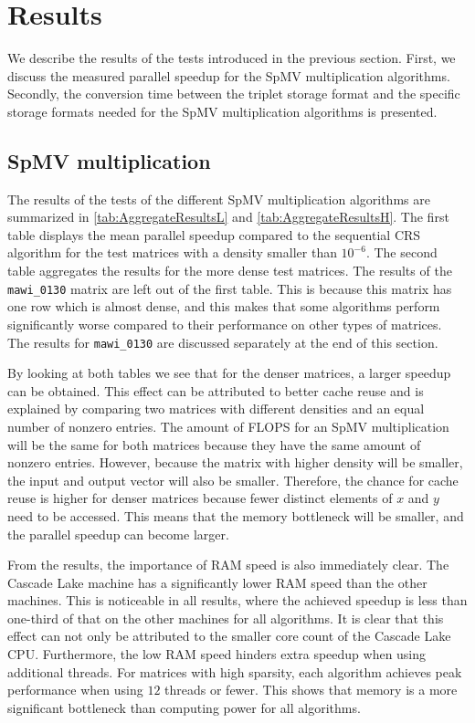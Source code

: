 \documentclass{siamart220329}
\begin{document}
\section{Results}\label{sec:results}
We describe the results of the tests introduced in the previous section. First, we discuss the measured parallel speedup for the SpMV multiplication algorithms. Secondly, the conversion time between the triplet storage format and the specific storage formats needed for the SpMV multiplication algorithms is presented.

\subsection{SpMV multiplication}
The results of the tests of the different SpMV multiplication algorithms are summarized in \cref{tab:AggregateResultsL} and \cref{tab:AggregateResultsH}. The first table displays the mean parallel speedup compared to the sequential CRS algorithm for the test matrices with a density smaller than $10^{-6}$. The second table aggregates the results for the more dense test matrices. The results of the \texttt{mawi\_0130} matrix are left out of the first table. This is because this matrix has one row which is almost dense, and this makes that some algorithms perform significantly worse compared to their performance on other types of matrices. The results for \texttt{mawi\_0130} are discussed separately at the end of this section.




By looking at both tables we see that for the denser matrices, a larger speedup can be obtained. This effect can be attributed to better cache reuse and is explained by comparing two matrices with different densities and an equal number of nonzero entries. The amount of FLOPS for an SpMV multiplication will be the same for both matrices because they have the same amount of nonzero entries. However, because the matrix with higher density will be smaller, the input and output vector will also be smaller. Therefore, the chance for cache reuse is higher for denser matrices because fewer distinct elements of $x$ and $y$ need to be accessed. This means that the memory bottleneck will be smaller, and the parallel speedup can become larger.

From the results, the importance of RAM speed is also immediately clear. The Cascade Lake machine has a significantly lower RAM speed than the other machines. This is noticeable in all results, where the achieved speedup is less than one-third of that on the other machines for all algorithms. It is clear that this effect can not only be attributed to the smaller core count of the Cascade Lake CPU. Furthermore, the low RAM speed hinders extra speedup when using additional threads. For matrices with high sparsity, each algorithm achieves peak performance when using $12$ threads or fewer. This shows that memory is a more significant bottleneck than computing power for all algorithms.
\end{document}
